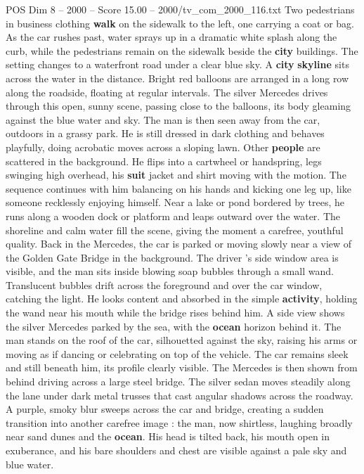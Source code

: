 \begin{textsample}{POS Dim 8 – 2000 – Score 15.00 – 2000/tv\_com\_2000\_116.txt}
Two pedestrians in business clothing \textbf{walk} on the sidewalk to the left, one carrying a coat or bag.
As the car rushes past, water sprays up in a dramatic white splash along the curb, while the pedestrians remain on the sidewalk beside the \textbf{city} buildings.
The setting changes to a waterfront road under a clear blue sky.
A \textbf{city} \textbf{skyline} sits across the water in the distance.
Bright red balloons are arranged in a long row along the roadside, floating at regular intervals.
The silver Mercedes drives through this open, sunny scene, passing close to the balloons, its body gleaming against the blue water and sky.
The man is then seen away from the car, outdoors in a grassy park.
He is still dressed in dark clothing and behaves playfully, doing acrobatic moves across a sloping lawn.
Other \textbf{people} are scattered in the background.
He flips into a cartwheel or handspring, legs swinging high overhead, his \textbf{suit} jacket and shirt moving with the motion.
The sequence continues with him balancing on his hands and kicking one leg up, like someone recklessly enjoying himself.
Near a lake or pond bordered by trees, he runs along a wooden dock or platform and leaps outward over the water.
The shoreline and calm water fill the scene, giving the moment a carefree, youthful quality.
Back in the Mercedes, the car is parked or moving slowly near a view of the Golden Gate Bridge in the background.
The driver ’s side window area is visible, and the man sits inside blowing soap bubbles through a small wand.
Translucent bubbles drift across the foreground and over the car window, catching the light.
He looks content and absorbed in the simple \textbf{activity}, holding the wand near his mouth while the bridge rises behind him.
A side view shows the silver Mercedes parked by the sea, with the \textbf{ocean} horizon behind it.
The man stands on the roof of the car, silhouetted against the sky, raising his arms or moving as if dancing or celebrating on top of the vehicle.
The car remains sleek and still beneath him, its profile clearly visible.
The Mercedes is then shown from behind driving across a large steel bridge.
The silver sedan moves steadily along the lane under dark metal trusses that cast angular shadows across the roadway.
A purple, smoky blur sweeps across the car and bridge, creating a sudden transition into another carefree image : the man, now shirtless, laughing broadly near sand dunes and the \textbf{ocean}.
His head is tilted back, his mouth open in exuberance, and his bare shoulders and chest are visible against a pale sky and blue water.

\end{textsample}

